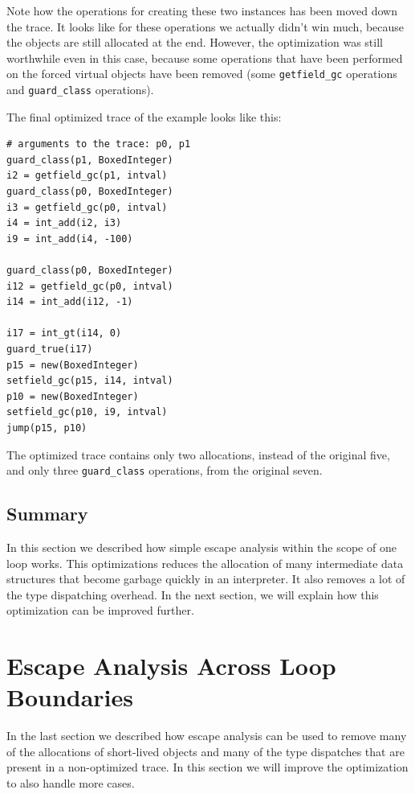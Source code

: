 \documentclass{sigplanconf}
\begin{document}
Note how the operations for creating these two instances has been moved down the
trace. It looks like for these operations we actually didn't win much, because
the objects are still allocated at the end. However, the optimization was still
worthwhile even in this case, because some operations that have been performed
on the forced virtual objects have been removed (some \texttt{getfield\_gc} operations
and \texttt{guard\_class} operations).

The final optimized trace of the example looks like this:

\begin{verbatim}
# arguments to the trace: p0, p1
guard_class(p1, BoxedInteger)
i2 = getfield_gc(p1, intval)
guard_class(p0, BoxedInteger)
i3 = getfield_gc(p0, intval)
i4 = int_add(i2, i3)
i9 = int_add(i4, -100)

guard_class(p0, BoxedInteger)
i12 = getfield_gc(p0, intval)
i14 = int_add(i12, -1)

i17 = int_gt(i14, 0)
guard_true(i17)
p15 = new(BoxedInteger)
setfield_gc(p15, i14, intval)
p10 = new(BoxedInteger)
setfield_gc(p10, i9, intval)
jump(p15, p10)
\end{verbatim}

The optimized trace contains only two allocations, instead of the original five,
and only three \texttt{guard\_class} operations, from the original seven.



\subsection{Summary}

In this section we described how simple escape analysis within the scope of one
loop works. This optimizations reduces the allocation of many intermediate data
structures that become garbage quickly in an interpreter. It also removes a lot
of the type dispatching overhead. In the next section, we will explain how this
optimization can be improved further.


\section{Escape Analysis Across Loop Boundaries}
\label{sec:crossloop}

In the last section we described how escape analysis can be used to remove
many of the allocations of short-lived objects and many of the type dispatches
that are present in a non-optimized trace. In this section we will improve the
optimization to also handle more cases.
\end{document}
